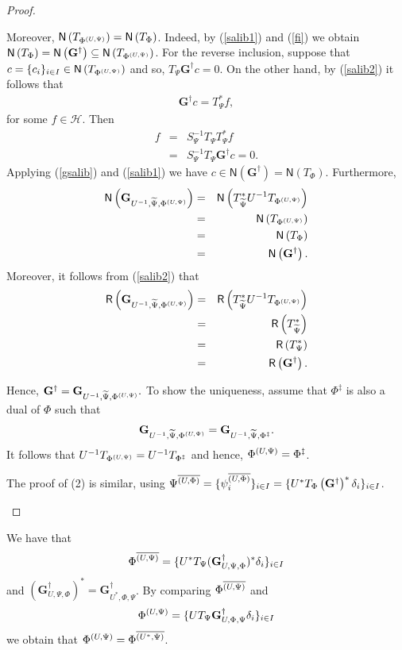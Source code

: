 \documentclass{birkjour}
\theoremstyle{definition}
\theoremstyle{remark}
\numberwithin{equation}{section}
\newcommand{\range}[1]{\mathsf{R}\left( #1 \right)}
\newcommand{\kernel}[1]{\mathsf{N}\left( #1 \right)}
\begin{document}
\begin{proof}
\begin{enumerate}
Moreover,
$\kernel{T_{\Phisd}}=\kernel{T_{\Phi}}$. Indeed, by
(\ref{salib1}) and (\ref{fi}) we obtain
 $\kernel{T_{\Phi}}=\kernel{\mathbf{G}^{\dag}}\subseteq
\kernel{T_{\Phisd}}$. For the reverse inclusion, suppose that
$c=\{c_i\}_{i\in I}\in \kernel{T_{\Phisd}}$ and so,
$T_{\Psi}\mathbf{G}^{\dag}c=0.$ On the other hand, by (\ref{salib2})
it follows that
\begin{eqnarray}\label{gsalib}
\mathbf{G^{\dag}}c=T_{\Psi}^*f,
\end{eqnarray}
 for some $f\in \mathcal{H}$. Then
\begin{eqnarray*}
f&=&S_{\Psi}^{-1}T_{\Psi}T_{\Psi}^*f\\
&=&S_{\Psi}^{-1}T_{\Psi}\mathbf{G}^{\dag}c=0.
\end{eqnarray*}
Applying (\ref{gsalib}) and (\ref{salib1}) we have $c\in
\kernel{\mathbf{G}^{\dag}}=\kernel{T_{\Phi}}$.
Furthermore,
\begin{eqnarray*}
\kernel{\mathbf{G}_{U^{-1},\widetilde{\Psi},\Phisd}}&=&
\kernel{T_{\widetilde{\Psi}}^*U^{-1}T_{\Phisd}}\\
&=&\kernel{T_{\Phisd}}\\
&=&\kernel{T_{\Phi}}\\
&=&\kernel{\mathbf{G}^{\dag}}. 
\end{eqnarray*}
Moreover, it follows from (\ref{salib2}) that
\begin{eqnarray*}
\range{\mathbf{G}_{U^{-1}, \widetilde{\Psi},\Phisd}}&=&
\range{T_{ \widetilde{\Psi}}^*U^{-1}T_{\Phisd}} \\
&=&\range{T_{ \widetilde{\Psi}}^*}\\
&=&\range{T_{\Psi}^*}\\
&=&\range{\mathbf{G}^{\dag}}. 
\end{eqnarray*}


Hence, $\mathbf{G}^{\dag}=\mathbf{G}_{U^{-1},\widetilde{\Psi},\Phi^{\left(U,\Psi\right)}}.$ To
show the uniqueness, assume that $\Phi^{\ddagger}$ is also a dual
of $\Phi$ such that
\begin{eqnarray*}
\mathbf{G}_{U^{-1},\widetilde{\Psi},\Phi^{\left(U,\Psi\right)}}=\mathbf{G}_{U^{-1},\widetilde{\Psi},\Phi^{\ddagger}}.
\end{eqnarray*}
It follows that  $U^{-1}T_{\Phi^{\left(U,\Psi\right)}}=U^{-1}T_{\Phi^{\ddagger}}$
and hence, $\Phi^{\left(U,\Psi\right)}=\Phi^{\ddagger}$. 

The proof of (2) is
similar, using $\Psi^{\overline{\left( U,\Phi\right)}} = \{ \psi^{\overline{\left( U,\Phi\right)}}_i \}_{i\in I}   = \{ U^*T_{\Phi}\left( \mathbf{G}^{\dag} \right)^* \delta_{i} \}_{i\in I}$.
\end{enumerate}
\end{proof}
We have that
$$\Phi^{\overline{\left( U,\Psi\right)}}=\{U^*T_{\Psi}(\mathbf{G}_{U,\Psi,\Phi}^{\dagger})^{*}\delta_i\}_{i\in I}$$
and $(\mathbf{G}_{U,\Psi,\Phi}^{\dagger})^{*}=\mathbf{G}_{U^*,\Phi,\Psi}^{\dagger}$. By comparing $\Phi^{\overline{\left( U,\Psi\right)}}$ and
$$\Phi^{\left(U,\Psi\right)}=\{UT_{\Psi}\mathbf{G}_{U,\Phi,\Psi}^{\dagger}\delta_i\}_{i\in I}$$
we obtain that $\Phi^{\left(U,\Psi\right)}=\Phi^{\overline{\left( U^*,\Psi\right)}}$.
\end{document}

